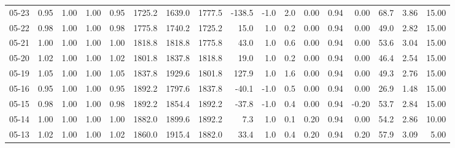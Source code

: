 \begin{threeparttable}
{\begin{tabular}{lrrrrrrrrrrrrrrrr}
  05-23 &         0.95 &           1.00 &          1.00 &          0.95 & 1725.2 & 1639.0 & 1777.5 &     -138.5 &                     -1.0 &                 2.0 &       0.00 &      0.94 &           0.00 &             68.7 &            3.86 &                  15.00 \\
  05-22 &         0.98 &           1.00 &          1.00 &          0.98 & 1775.8 & 1740.2 & 1725.2 &       15.0 &                      1.0 &                 0.2 &       0.00 &      0.94 &           0.00 &             49.0 &            2.82 &                  15.00 \\
  05-21 &         1.00 &           1.00 &          1.00 &          1.00 & 1818.8 & 1818.8 & 1775.8 &       43.0 &                      1.0 &                 0.6 &       0.00 &      0.94 &           0.00 &             53.6 &            3.04 &                  15.00 \\
  05-20 &         1.02 &           1.00 &          1.00 &          1.02 & 1801.8 & 1837.8 & 1818.8 &       19.0 &                      1.0 &                 0.2 &       0.00 &      0.94 &           0.00 &             46.4 &            2.54 &                  15.00 \\
  05-19 &         1.05 &           1.00 &          1.00 &          1.05 & 1837.8 & 1929.6 & 1801.8 &      127.9 &                      1.0 &                 1.6 &       0.00 &      0.94 &           0.00 &             49.3 &            2.76 &                  15.00 \\
  05-16 &         0.95 &           1.00 &          1.00 &          0.95 & 1892.2 & 1797.6 & 1837.8 &      -40.1 &                     -1.0 &                 0.5 &       0.00 &      0.94 &           0.00 &             26.9 &            1.48 &                  15.00 \\
  05-15 &         0.98 &           1.00 &          1.00 &          0.98 & 1892.2 & 1854.4 & 1892.2 &      -37.8 &                     -1.0 &                 0.4 &       0.00 &      0.94 &          -0.20 &             53.7 &            2.84 &                  15.00 \\
  05-14 &         1.00 &           1.00 &          1.00 &          1.00 & 1882.0 & 1899.6 & 1892.2 &        7.3 &                      1.0 &                 0.1 &       0.20 &      0.94 &           0.00 &             54.2 &            2.86 &                  10.00 \\
  05-13 &         1.02 &           1.00 &          1.00 &          1.02 & 1860.0 & 1915.4 & 1882.0 &       33.4 &                      1.0 &                 0.4 &       0.20 &      0.94 &           0.20 &             57.9 &            3.09 &                   5.00 \\

\end{tabular}}
\end{threeparttable}
